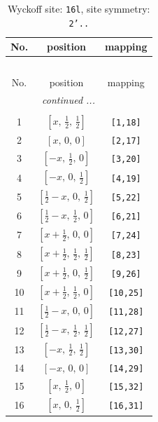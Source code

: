 \documentclass[fleqn,8pt]{jsarticle}
\begin{document}
\renewcommand{\arraystretch}{1.2}
\begin{longtable}{ccc}
\caption{Wyckoff site: {\tt 16l}, site symmetry: {\tt 2'..}}
 \\
 \hline \hline
No. & position & mapping \\ \hline \endfirsthead

\multicolumn{2}{l}{\tablename\ \thetable{}} \\
 \hline \hline
No. & position & mapping \\ \hline \endhead

 \hline \hline
\multicolumn{2}{r}{\footnotesize\it continued ...} \\ \endfoot

 \hline \hline
\multicolumn{2}{r}{} \\ \endlastfoot

1 & $\left[ x,\, \frac{1}{2},\, \frac{1}{2} \right]$ & {\tt [1,18]} \\ \hline
2 & $\left[ x,\, 0,\, 0 \right]$ & {\tt [2,17]} \\ \hline
3 & $\left[ - x,\, \frac{1}{2},\, 0 \right]$ & {\tt [3,20]} \\ \hline
4 & $\left[ - x,\, 0,\, \frac{1}{2} \right]$ & {\tt [4,19]} \\ \hline
5 & $\left[ \frac{1}{2} - x,\, 0,\, \frac{1}{2} \right]$ & {\tt [5,22]} \\ \hline
6 & $\left[ \frac{1}{2} - x,\, \frac{1}{2},\, 0 \right]$ & {\tt [6,21]} \\ \hline
7 & $\left[ x + \frac{1}{2},\, 0,\, 0 \right]$ & {\tt [7,24]} \\ \hline
8 & $\left[ x + \frac{1}{2},\, \frac{1}{2},\, \frac{1}{2} \right]$ & {\tt [8,23]} \\ \hline
9 & $\left[ x + \frac{1}{2},\, 0,\, \frac{1}{2} \right]$ & {\tt [9,26]} \\ \hline
10 & $\left[ x + \frac{1}{2},\, \frac{1}{2},\, 0 \right]$ & {\tt [10,25]} \\ \hline
11 & $\left[ \frac{1}{2} - x,\, 0,\, 0 \right]$ & {\tt [11,28]} \\ \hline
12 & $\left[ \frac{1}{2} - x,\, \frac{1}{2},\, \frac{1}{2} \right]$ & {\tt [12,27]} \\ \hline
13 & $\left[ - x,\, \frac{1}{2},\, \frac{1}{2} \right]$ & {\tt [13,30]} \\ \hline
14 & $\left[ - x,\, 0,\, 0 \right]$ & {\tt [14,29]} \\ \hline
15 & $\left[ x,\, \frac{1}{2},\, 0 \right]$ & {\tt [15,32]} \\ \hline
16 & $\left[ x,\, 0,\, \frac{1}{2} \right]$ & {\tt [16,31]} \\
\end{longtable}
\end{document}
